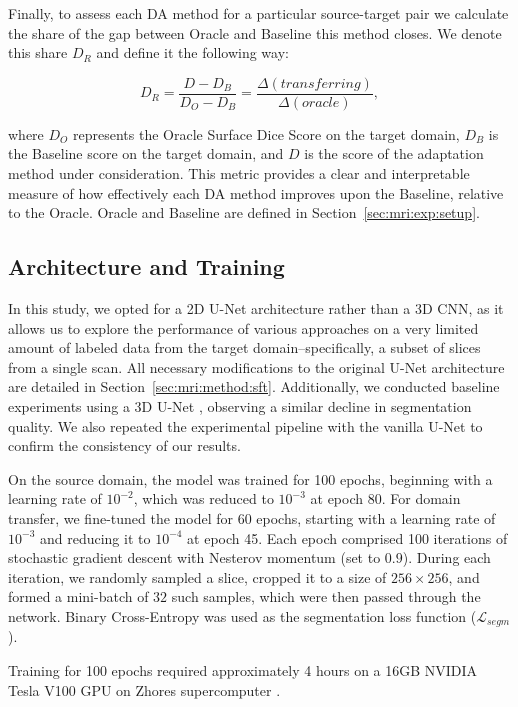 Finally, to assess each DA method for a particular source-target pair we calculate the share of the gap between Oracle and Baseline this method closes. We denote this share $D_R$ and define it the following way:

\begin{equation}
	D_R = \dfrac{D - D_B}{D_O - D_B} = \dfrac{\Delta(transferring)}{\Delta(oracle)},
\end{equation}

\noindent
where $D_O$ represents the Oracle Surface Dice Score on the target domain, $D_B$ is the Baseline score on the target domain, and $D$ is the score of the adaptation method under consideration. This metric provides a clear and interpretable measure of how effectively each DA method improves upon the Baseline, relative to the Oracle. Oracle and Baseline are defined in Section~\ref{sec:mri:exp:setup}.


\subsection{Architecture and Training}

In this study, we opted for a 2D U-Net architecture \cite{ronneberger2015u} rather than a 3D CNN, as it allows us to explore the performance of various approaches on a very limited amount of labeled data from the target domain--specifically, a subset of slices from a single scan. All necessary modifications to the original U-Net architecture are detailed in Section~\ref{sec:mri:method:sft}. Additionally, we conducted baseline experiments using a 3D U-Net \cite{cciccek20163d}, observing a similar decline in segmentation quality. We also repeated the experimental pipeline with the vanilla U-Net to confirm the consistency of our results.

On the source domain, the model was trained for 100 epochs, beginning with a learning rate of $10^{-2}$, which was reduced to $10^{-3}$ at epoch 80. For domain transfer, we fine-tuned the model for 60 epochs, starting with a learning rate of $10^{-3}$ and reducing it to $10^{-4}$ at epoch 45. Each epoch comprised 100 iterations of stochastic gradient descent with Nesterov momentum (set to $0.9$). During each iteration, we randomly sampled a slice, cropped it to a size of $256 \times 256$, and formed a mini-batch of $32$ such samples, which were then passed through the network. Binary Cross-Entropy was used as the segmentation loss function ($\mathcal{L}_{segm}$).

Training for 100 epochs required approximately 4 hours on a 16GB NVIDIA Tesla V100 GPU on Zhores supercomputer \cite{zacharov2019zhores}.


